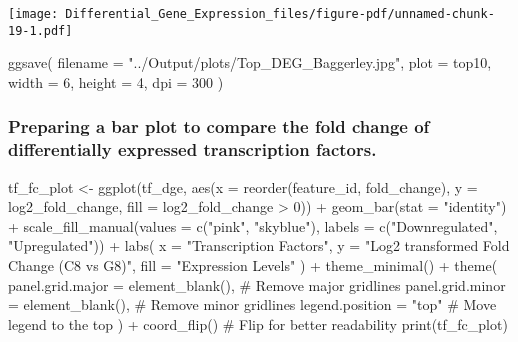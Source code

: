 \documentclass[
  letterpaper,
  DIV=11,
  numbers=noendperiod]{scrartcl}
\newenvironment{Shaded}{\begin{snugshade}}{\end{snugshade}}
\newcommand{\AttributeTok}[1]{\textcolor[rgb]{0.40,0.45,0.13}{#1}}
\newcommand{\CommentTok}[1]{\textcolor[rgb]{0.37,0.37,0.37}{#1}}
\newcommand{\DecValTok}[1]{\textcolor[rgb]{0.68,0.00,0.00}{#1}}
\newcommand{\FunctionTok}[1]{\textcolor[rgb]{0.28,0.35,0.67}{#1}}
\newcommand{\NormalTok}[1]{\textcolor[rgb]{0.00,0.23,0.31}{#1}}
\newcommand{\OtherTok}[1]{\textcolor[rgb]{0.00,0.23,0.31}{#1}}
\newcommand{\SpecialCharTok}[1]{\textcolor[rgb]{0.37,0.37,0.37}{#1}}
\newcommand{\StringTok}[1]{\textcolor[rgb]{0.13,0.47,0.30}{#1}}
\begin{document}
\texttt{[image: Differential\_Gene\_Expression\_files/figure-pdf/unnamed-chunk-19-1.pdf]}

\begin{Shaded}
\begin{Highlighting}[]
\FunctionTok{ggsave}\NormalTok{(}
  \AttributeTok{filename =} \StringTok{"../Output/plots/Top\_DEG\_Baggerley.jpg"}\NormalTok{,   }
  \AttributeTok{plot =}\NormalTok{ top10,                      }
  \AttributeTok{width =} \DecValTok{6}\NormalTok{, }\AttributeTok{height =} \DecValTok{4}\NormalTok{,               }
  \AttributeTok{dpi =} \DecValTok{300}                            
\NormalTok{)}
\end{Highlighting}
\end{Shaded}

\subsubsection{Preparing a bar plot to compare the fold change of
differentially expressed transcription
factors.}\label{preparing-a-bar-plot-to-compare-the-fold-change-of-differentially-expressed-transcription-factors.}

\begin{Shaded}
\begin{Highlighting}[]
\NormalTok{tf\_fc\_plot }\OtherTok{\textless{}{-}} \FunctionTok{ggplot}\NormalTok{(tf\_dge, }\FunctionTok{aes}\NormalTok{(}\AttributeTok{x =} \FunctionTok{reorder}\NormalTok{(feature\_id, fold\_change), }
                   \AttributeTok{y =}\NormalTok{ log2\_fold\_change, }
                   \AttributeTok{fill =}\NormalTok{ log2\_fold\_change }\SpecialCharTok{\textgreater{}} \DecValTok{0}\NormalTok{)) }\SpecialCharTok{+}
  \FunctionTok{geom\_bar}\NormalTok{(}\AttributeTok{stat =} \StringTok{"identity"}\NormalTok{) }\SpecialCharTok{+}
  \FunctionTok{scale\_fill\_manual}\NormalTok{(}\AttributeTok{values =} \FunctionTok{c}\NormalTok{(}\StringTok{"pink"}\NormalTok{, }\StringTok{"skyblue"}\NormalTok{), }
                    \AttributeTok{labels =} \FunctionTok{c}\NormalTok{(}\StringTok{"Downregulated"}\NormalTok{, }\StringTok{"Upregulated"}\NormalTok{)) }\SpecialCharTok{+}
  \FunctionTok{labs}\NormalTok{(}
    \AttributeTok{x =} \StringTok{"Transcription Factors"}\NormalTok{, }
    \AttributeTok{y =} \StringTok{"Log2 transformed Fold Change (C8 vs G8)"}\NormalTok{, }
    \AttributeTok{fill =} \StringTok{"Expression Levels"}
\NormalTok{  ) }\SpecialCharTok{+}
  \FunctionTok{theme\_minimal}\NormalTok{() }\SpecialCharTok{+}
  \FunctionTok{theme}\NormalTok{(}
    \AttributeTok{panel.grid.major =} \FunctionTok{element\_blank}\NormalTok{(), }\CommentTok{\# Remove major gridlines}
    \AttributeTok{panel.grid.minor =} \FunctionTok{element\_blank}\NormalTok{(), }\CommentTok{\# Remove minor gridlines}
    \AttributeTok{legend.position =} \StringTok{"top"} \CommentTok{\# Move legend to the top}
\NormalTok{  ) }\SpecialCharTok{+}
  \FunctionTok{coord\_flip}\NormalTok{()  }\CommentTok{\# Flip for better readability}
\FunctionTok{print}\NormalTok{(tf\_fc\_plot)}
\end{Highlighting}
\end{Shaded}
\end{document}
